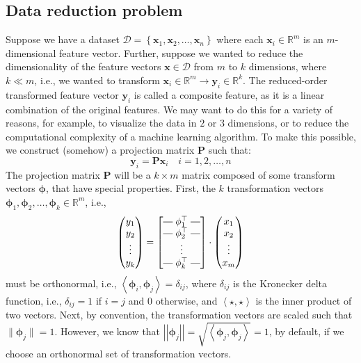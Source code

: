 \documentclass{article}[11pt]
\makeatletter
\newcommand{\brows}[1]{%
  \begin{bmatrix}
  \begin{array}{@{\protect\rotvert\;}c@{\;\protect\rotvert}}
  #1
  \end{array}
  \end{bmatrix}
}
\newcommand{\rotvert}{\rotatebox[origin=c]{90}{$\vert$}}
\newcommand{\rowsvdots}{\multicolumn{1}{@{}c@{}}{\vdots}}
\def\R{\mathbb{R}}
\def\D{\mathcal{D}}
\newcommand{\norm}[1]{\left|\left|#1\right|\right|}
\makeatother
\begin{document}
\subsection{Data reduction problem}
Suppose we have a dataset $\D = \left\{\mathbf{x}_{1},\mathbf{x}_{2},\dots,\mathbf{x}_{n}\right\}$ where each $\mathbf{x}_{i}\in\mathbb{R}^{m}$ is an $m$-dimensional feature vector.
Further, suppose we wanted to reduce the dimensionality of the feature vectors $\mathbf{x}\in\D$ from $m$ to $k$ dimensions, where $k\ll{m}$, 
i.e., we wanted to transform $\mathbf{x}_{i}\in\R^{m}\rightarrow\mathbf{y}_{i}\in\R^{k}$. 
The reduced-order transformed feature vector $\mathbf{y}_{i}$ is called a composite feature, as it is a linear combination of the original features.
We may want to do this for a variety of reasons, for example, to visualize the data in $2$ or $3$ dimensions, or to reduce the computational complexity of a machine learning algorithm.
To make this possible, we construct (somehow) a projection matrix $\mathbf{P}$ such that:
\begin{equation}
   \mathbf{y}_{i} = \mathbf{P}\mathbf{x}_{i}\quad{i=1,2,\dots,n}
\end{equation}
The projection matrix $\mathbf{P}$ will be a $k\times{m}$ matrix composed of some transform vectors $\mathbf{\phi}$, that have special properties.
First, the $k$ transformation vectors ${\mathbf{\phi}}_{1},{\mathbf{\phi}}_{2},\dots,{\mathbf{\phi}}_{k}\in\R^{m}$, i.e.,
\begin{equation}
   \begin{pmatrix}
      y_{1} \\
      y_{2} \\
      \vdots \\
      y_{k}
   \end{pmatrix} = \brows{{\mathbf{\phi}}_1^\top \\ {\mathbf{\phi}}_2^\top \\ \rowsvdots \\ {\mathbf{\phi}}_k^\top}
   \cdot
   \begin{pmatrix}
      x_{1} \\
      x_{2} \\
      \vdots \\
      x_{m}
   \end{pmatrix}
\end{equation}
must be orthonormal, i.e., $\left<{\mathbf{\phi}}_{i},{\mathbf{\phi}}_{j}\right> = \delta_{ij}$, 
where $\delta_{ij}$ is the Kronecker delta function, i.e., $\delta_{ij} = 1$ if $i=j$ and $0$ otherwise, and
$\left<\star,\star\right>$ is the inner product of two vectors.
Next, by convention, the transformation vectors are scaled such that $\|{\mathbf{\phi}}_{j}\|=1$.
However, we know that $\norm{\mathbf{\phi}_{j}} = \sqrt{\left<\mathbf{\phi}_{j},\mathbf{\phi}_{j}\right>} = 1$, 
by default, if we choose an orthonormal set of transformation vectors. 
\end{document}
